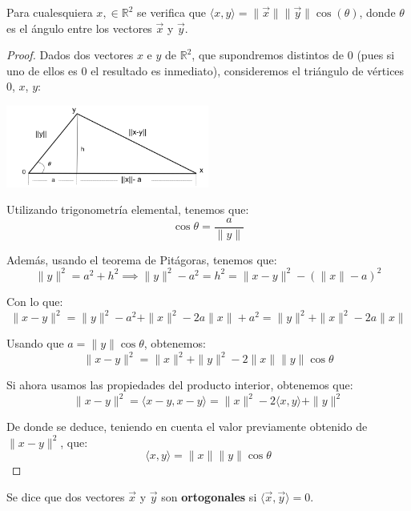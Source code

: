 \begin{teorema}
    Para cualesquiera $x, \in \mathbb{R}^2$ se verifica que $\langle x, y\rangle = \|\vec{x}\| \|\vec{y}\| \cos(\theta)$, donde $\theta$ es el ángulo entre los vectores $\vec{x}$ y $\vec{y}$.
\end{teorema}
\begin{proof}
    Dados dos vectores \( x \) e \( y \) de \( \mathbb{R}^2 \), que supondremos distintos de 0 (pues si uno de ellos es 0 el resultado es inmediato), consideremos el triángulo de vértices \( 0 \), \( x \), \( y \):
    
    
    \begin{center}
    \includegraphics[width=0.5\textwidth]{Graphics/triangulo.png} %
    \end{center}
    Utilizando trigonometría elemental, tenemos que:
    \[
    \cos \theta = \frac{a}{\|y\|}
    \]

    Además, usando el teorema de Pitágoras, tenemos que:
    $$ \|y\|^2 = a^2 + h^2 \implies \|y\|^2 - a^2 = h^2 = \|x - y\|^2 - (\|x\| - a)^2$$

    Con lo que:
    \[
    \|x - y\|^2 = \|y\|^2 - a^2 + \|x\|^2 - 2a\|x\| + a^2 = \|y\|^2 + \|x\|^2 - 2a\|x\|
    \]

    Usando que \( a = \|y\|\cos\theta \), obtenemos:
    \[
    \|x - y\|^2 = \|x\|^2 + \|y\|^2 - 2\|x\|\|y\|\cos\theta
    \]

    Si ahora usamos las propiedades del producto interior, obtenemos que:
    \[
    \|x - y\|^2 = \langle x - y, x - y \rangle = \|x\|^2 - 2\langle x, y \rangle + \|y\|^2
    \]

    De donde se deduce, teniendo en cuenta el valor previamente obtenido de \( \|x - y\|^2 \), que:
    \[
    \langle x, y \rangle = \|x\| \|y\| \cos\theta
    \]
\end{proof}

\begin{definición}
    Se dice que dos vectores \( \vec{x} \) y \( \vec{y} \) son \textbf{ortogonales} si $\langle \vec{x}, \vec{y} \rangle = 0$.
\end{definición}

